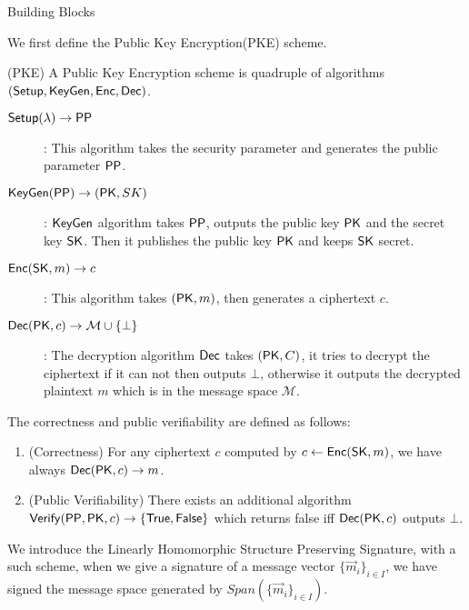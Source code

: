 \begin{subsection}{Building Blocks}

  We first define the Public Key Encryption(PKE) scheme.

  \begin{myDef}{(PKE)} A Public Key Encryption scheme is quadruple of algorithms $({\mathsf{Setup}}, {\mathsf{KeyGen}}, {\mathsf{Enc}}, {\mathsf{Dec}})$.
    \begin{description}
    \item[$\boldmath{{\mathsf{Setup}}(\lambda) \to \mathsf{PP}}$]: This algorithm takes the security parameter and generates the public parameter $\mathsf{PP}$.
    \item[$\boldmath{{\mathsf{KeyGen}}(\mathsf{PP}) \to (\mathsf{PK}, SK)}$]: ${\mathsf{KeyGen}}$ algorithm takes $\mathsf{PP}$, outputs the public key $\mathsf{PK}$ and the secret key $\mathsf{SK}$. Then it publishes the public key $\mathsf{PK}$ and keeps $\mathsf{SK}$ secret.
    \item[$\boldmath{{\mathsf{Enc}}(\mathsf{SK}, m) \to c}$]: This algorithm takes $(\mathsf{PK}, m)$, then generates a ciphertext $c$.
    \item[$\boldmath{{\mathsf{Dec}}(\mathsf{PK}, c) \to \mathcal{M} \cup \{\bot\}}$]: The decryption algorithm ${\mathsf{Dec}}$ takes $(\mathsf{PK}, C)$, it tries to decrypt the ciphertext if it can not then outputs $\bot$, otherwise it outputs the decrypted plaintext $m$ which is in the message space $\mathcal{M}$.
    \end{description}

    The correctness and public verifiability are defined as follows:
    \begin{enumerate}
    \item (Correctness) For any ciphertext $c$ computed by $c \gets {\mathsf{Enc}}(\mathsf{SK}, m)$, we have always ${\mathsf{Dec}}(\mathsf{PK}, c) \to m$.
    \item (Public Verifiability) There exists an additional algorithm ${\mathsf{Verify}}(\mathsf{PP}, \mathsf{PK}, c) \to \{\mathsf{True}, \mathsf{False}\}$ which returns false iff ${\mathsf{Dec}}(\mathsf{PK}, c)$ outputs $\bot$. 
    \end{enumerate}
  \end{myDef}
  

  
  We introduce the Linearly Homomorphic Structure Preserving Signature, with a such scheme, when we give a signature of a message vector $\{\vec{m}_i\}_{i \in I}$, we have signed the message space generated by $Span(\{\vec{m}_i\}_{i \in I})$.
  

\end{subsection}
